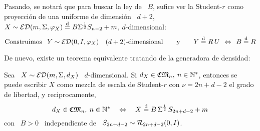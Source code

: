 Pasando, se notar\'a que para buscar la  ley de \ $B$, sufice ver la Student-$r$
como  proyecci\'on  de una  uniforme  de  dimensi\'on \  $d+2$,  \ie  \ $X  \sim
\mathcal{ED}(m,\Sigma,\varphi_X) \stackrel{\mathrm{d}}{=} B \Sigma^{\frac12} S_{n-2} + m$, $d$-dimensional:
%
\[
\mbox{Construimos     }     \:\:     Y     \sim     \mathcal{ED}(0,I,\varphi_X)     \quad
(d+2)\mbox{-dimensional}  \qquad   \mbox{y}  \qquad  Y   \stackrel{\mathrm{d}}{=}  R  \,   U  \:\:
\Leftrightarrow \:\: B \stackrel{\mathrm{d}}{=} R
\]


De nuevo, existe un teorema equivalente tratando de la generadora de densidad:
%
\begin{teorema}
\label{Teo:MP:MezclaStudentRDensidad}
%
  Sea \  $X \sim \mathcal{ED}(m,\Sigma,d_X)$ \  $d$-dimensional. Si $d_X \in  \mathfrak{CM}_n, \: n
  \in  \mathbb{N}^*$,  entonces  se puede  escribir  $X$  como  mezcla de  escala  de
  Student-$r$ con $\nu = 2 n + d - 2$ el grado de libertad, y reciprocamente,
  \[
  d_X \in  \mathfrak{CM}_n, \:  n \in \mathbb{N}^*  \quad \Leftrightarrow  \quad X \stackrel{\mathrm{d}}{=}  B \,
  \Sigma^{\frac12} \, S_{2 n + d - 2} + m
  \]
  con \ $B > 0$ \ independiente de \ $S_{2 n + d - 2} \sim \mathcal{R}_{2 n + d - 2}(0,I)$.
\end{teorema}
%
